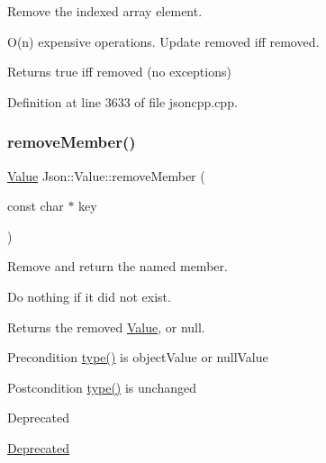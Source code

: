 Remove the indexed array element. 

O(n) expensive operations. Update \textquotesingle{}removed\textquotesingle{} iff removed. \begin{DoxyReturn}{Returns}
true iff removed (no exceptions) 
\end{DoxyReturn}


Definition at line 3633 of file jsoncpp.\+cpp.

\hypertarget{class_json_1_1_value_aa52f7873b95d29627d6e83ba96f69aaa}{}\label{class_json_1_1_value_aa52f7873b95d29627d6e83ba96f69aaa} 
\subsubsection{\texorpdfstring{remove\+Member()}{removeMember()}\hspace{0.1cm}{\footnotesize\ttfamily [1/10]}}
{\footnotesize\ttfamily \hyperlink{class_json_1_1_value}{Value} Json\+::\+Value\+::remove\+Member (\begin{DoxyParamCaption}\item[{const char $\ast$}]{key }\end{DoxyParamCaption})}



Remove and return the named member. 

Do nothing if it did not exist. \begin{DoxyReturn}{Returns}
the removed \hyperlink{class_json_1_1_value}{Value}, or null. 
\end{DoxyReturn}
\begin{DoxyPrecond}{Precondition}
\hyperlink{class_json_1_1_value_a8ce61157a011894f0252ceed232312de}{type()} is object\+Value or null\+Value 
\end{DoxyPrecond}
\begin{DoxyPostcond}{Postcondition}
\hyperlink{class_json_1_1_value_a8ce61157a011894f0252ceed232312de}{type()} is unchanged 
\end{DoxyPostcond}
\begin{DoxyRefDesc}{Deprecated}
\item[\hyperlink{deprecated__deprecated000013}{Deprecated}]\end{DoxyRefDesc}
\hypertarget{class_json_1_1_value_a1dfd5d30fbc53fcd9c4955b8b3e7885c}{}\label{class_json_1_1_value_a1dfd5d30fbc53fcd9c4955b8b3e7885c} 
